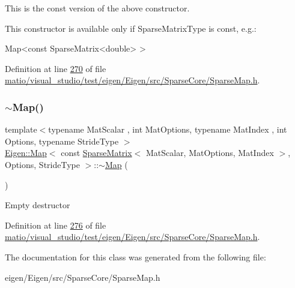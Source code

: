 This is the const version of the above constructor.

This constructor is available only if {\ttfamily Sparse\+Matrix\+Type} is const, e.\+g.\+: 
\begin{DoxyCode}
Map<const SparseMatrix<double> >  
\end{DoxyCode}
 

Definition at line \hyperlink{matio_2visual__studio_2test_2eigen_2_eigen_2src_2_sparse_core_2_sparse_map_8h_source_l00270}{270} of file \hyperlink{matio_2visual__studio_2test_2eigen_2_eigen_2src_2_sparse_core_2_sparse_map_8h_source}{matio/visual\+\_\+studio/test/eigen/\+Eigen/src/\+Sparse\+Core/\+Sparse\+Map.\+h}.

\mbox{\label{class_eigen_1_1_map_3_01const_01_sparse_matrix_3_01_mat_scalar_00_01_mat_options_00_01_mat_index4032bba20cf92aab8bcf07e926e15a4f_aa4b0d0dd528fef0e1f8ce8c043d42b21}} 
\subsubsection{\texorpdfstring{$\sim$\+Map()}{~Map()}\hspace{0.1cm}{\footnotesize\ttfamily [2/2]}}
{\footnotesize\ttfamily template$<$typename Mat\+Scalar , int Mat\+Options, typename Mat\+Index , int Options, typename Stride\+Type $>$ \\
\hyperlink{group___core___module_class_eigen_1_1_map}{Eigen\+::\+Map}$<$ const \hyperlink{group___sparse_core___module_class_eigen_1_1_sparse_matrix}{Sparse\+Matrix}$<$ Mat\+Scalar, Mat\+Options, Mat\+Index $>$, Options, Stride\+Type $>$\+::$\sim$\hyperlink{group___core___module_class_eigen_1_1_map}{Map} (\begin{DoxyParamCaption}{ }\end{DoxyParamCaption})\hspace{0.3cm}{\ttfamily [inline]}}

Empty destructor 

Definition at line \hyperlink{matio_2visual__studio_2test_2eigen_2_eigen_2src_2_sparse_core_2_sparse_map_8h_source_l00276}{276} of file \hyperlink{matio_2visual__studio_2test_2eigen_2_eigen_2src_2_sparse_core_2_sparse_map_8h_source}{matio/visual\+\_\+studio/test/eigen/\+Eigen/src/\+Sparse\+Core/\+Sparse\+Map.\+h}.



The documentation for this class was generated from the following file\+:\begin{DoxyCompactItemize}
\item 
eigen/\+Eigen/src/\+Sparse\+Core/\+Sparse\+Map.\+h\end{DoxyCompactItemize}
